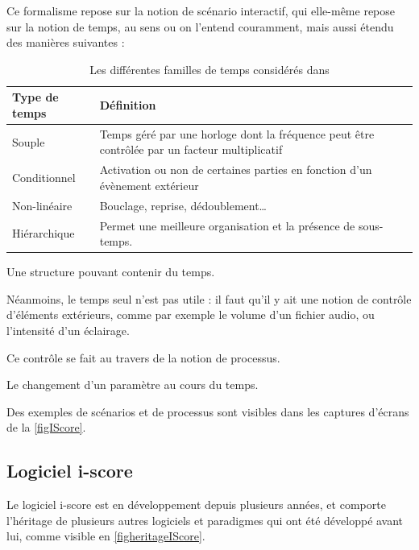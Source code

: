 Ce formalisme repose sur la notion de scénario interactif, qui elle-même repose sur la notion de temps, au sens ou on l'entend couramment, mais aussi étendu des manières suivantes :
\begin{table}[H]
	\centering
	\tabulinesep=3pt
	\begin{tabu} to \linewidth {XX[4]}
		Type de temps 	& Définition \\	\toprule[0.15em]
		Souple			& Temps géré par une horloge dont la fréquence peut être contrôlée par un facteur multiplicatif \\ \midrule
	
		Conditionnel	& Activation ou non de certaines parties en fonction d'un évènement extérieur\\ \midrule
		Non-linéaire	& Bouclage, reprise, dédoublement\dots \\ \midrule
		Hiérarchique	& Permet une meilleure organisation et la présence de sous-temps. \\ 
	\end{tabu}
	\caption{Les différentes familles de temps considérés dans }
\end{table}

\begin{mydef}[Scénario] Une structure pouvant contenir du temps.
\end{mydef}

Néanmoins, le temps seul n'est pas utile : il faut qu'il y ait une notion de contrôle d'éléments extérieurs, comme par exemple le volume d'un fichier audio, ou l'intensité d'un éclairage.

Ce contrôle se fait au travers de la notion de processus.

\begin{mydef}[Processus] Le changement d'un paramètre au cours du temps.
\end{mydef}

Des exemples de scénarios et de processus sont visibles dans les captures d'écrans de la \cref{figIScore}.

\subsection{Logiciel i-score}
Le logiciel i-score est en développement depuis plusieurs années, et comporte l'héritage de plusieurs autres logiciels et paradigmes qui ont été développé avant lui, comme visible en \cref{figheritageIScore}.

